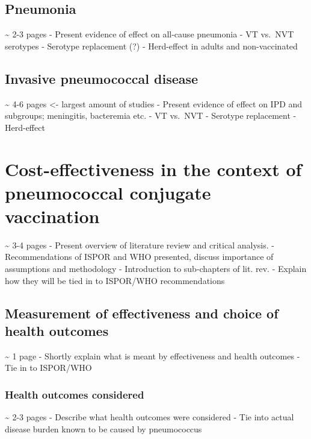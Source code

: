 \documentclass[]{book}
\theoremstyle{definition}
\theoremstyle{definition}
\theoremstyle{definition}
\theoremstyle{remark}
\begin{document}
\subsection{Pneumonia}\label{pneumonia-1}

\textasciitilde{} 2-3 pages - Present evidence of effect on all-cause
pneumonia - VT vs.~NVT serotypes - Serotype replacement (?) -
Herd-effect in adults and non-vaccinated

\subsection{Invasive pneumococcal
disease}\label{invasive-pneumococcal-disease-1}

\textasciitilde{} 4-6 pages \textless{}- largest amount of studies -
Present evidence of effect on IPD and subgroups; meningitis, bacteremia
etc. - VT vs.~NVT - Serotype replacement - Herd-effect

\section{Cost-effectiveness in the context of pneumococcal conjugate
vaccination}\label{cost-effectiveness-in-the-context-of-pneumococcal-conjugate-vaccination}

\textasciitilde{} 3-4 pages - Present overview of literature review and
critical analysis. - Recommendations of ISPOR and WHO presented, discuss
importance of assumptions and methodology - Introduction to sub-chapters
of lit. rev. - Explain how they will be tied in to ISPOR/WHO
recommendations

\subsection{Measurement of effectiveness and choice of health
outcomes}\label{measurement-of-effectiveness-and-choice-of-health-outcomes}

\textasciitilde{} 1 page - Shortly explain what is meant by
effectiveness and health outcomes - Tie in to ISPOR/WHO

\subsubsection{Health outcomes
considered}\label{health-outcomes-considered}

\textasciitilde{} 2-3 pages - Describe what health outcomes were
considered - Tie into actual disease burden known to be caused by
pneumococcus
\end{document}

